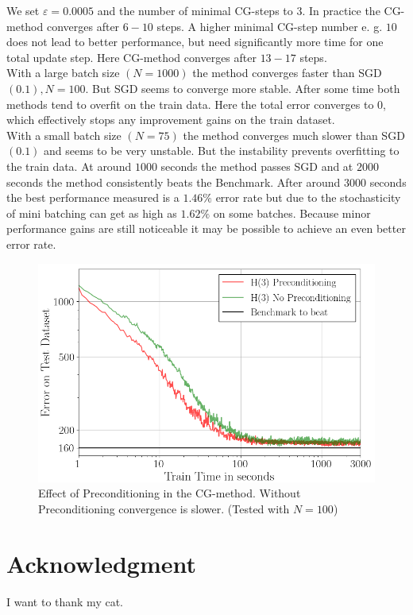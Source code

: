 \documentclass[conference]{IEEEtran}
\begin{document}
	We set $\varepsilon=0.0005$ and the number of minimal CG-steps to $3$. In practice the CG-method converges after $6-10$ steps. A higher minimal CG-step number e. g. $10$ does not lead to better performance, but need significantly more time for one total update step. Here CG-method converges after $13-17$ steps.\\
	With a large batch size $(N=1000)$ the method converges faster than SGD$(0.1), N=100.$ But SGD seems to converge more stable. After some time both methods tend to overfit on the train data. Here the total error converges to $0$, which effectively stops any improvement gains on the train dataset.\\
	With a small batch size $(N=75)$ the method converges much slower than SGD$(0.1)$ and seems to be very unstable. But the instability prevents overfitting to the train data. At around $1000$ seconds the method passes SGD and at $2000$ seconds the method consistently beats the Benchmark. After around $3000$ seconds the best performance measured is a $1.46\%$ error rate but due to the stochasticity of mini batching can get as high as $1.62\%$ on some batches. Because minor performance gains are still noticeable it may be possible to achieve an even better error rate. \\
	
	\begin{figure}[htbp]
	\centerline{\includegraphics[scale=0.53]{Precond.png}}
	\caption{Effect of Preconditioning in the CG-method. Without Preconditioning convergence is slower. (Tested with $N=100$)}
	\label{fig}
	\end{figure}		
	\section*{Acknowledgment}
	I want to thank my cat. 
	
\end{document}
